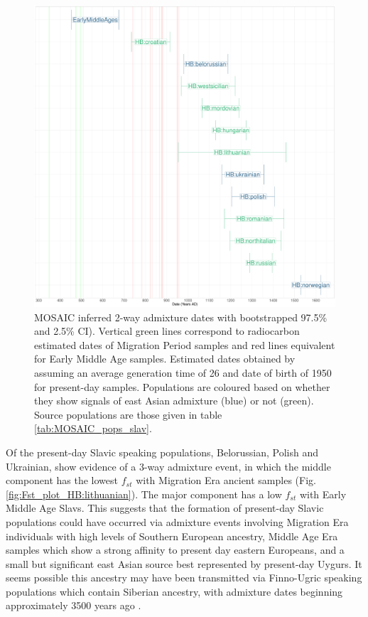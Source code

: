 \begin{figure}[htp]
    \centering
    \includegraphics[width=1.0\textwidth]{../images/chapter5/MOSAIC_admixture_dates_plot.pdf}
    \caption{MOSAIC inferred 2-way admixture dates with bootstrapped 97.5\% and 2.5\% CI). Vertical green lines correspond to radiocarbon estimated dates of Migration Period samples and red lines equivalent for Early Middle Age samples. Estimated dates obtained by assuming an average generation time of 26 and date of birth of 1950 for present-day samples. Populations are coloured based on whether they show signals of east Asian admixture (blue) or not (green). Source populations are those given in table \ref{tab:MOSAIC_pops_slav}.}
    \label{fig:MOSAIC_admixture_dates_plot}
\end{figure} 

Of the present-day Slavic speaking populations, Belorussian, Polish and Ukrainian, show evidence of a 3-way admixture event, in which the middle component has the lowest $f_{st}$ with Migration Era ancient samples (Fig. \ref{fig:Fst_plot_HB:lithuanian}). The major component has a low $f_{st}$ with Early Middle Age Slavs. This suggests that the formation of present-day Slavic populations could have occurred via admixture events involving Migration Era individuals with high levels of Southern European ancestry, Middle Age Era samples which show a strong affinity to present day eastern Europeans, and a small but significant east Asian source best represented by present-day Uygurs. It seems possible this ancestry may have been transmitted via Finno-Ugric speaking populations which contain Siberian ancestry, with admixture dates beginning approximately 3500 years ago \cite{Lamnidis2018}.

